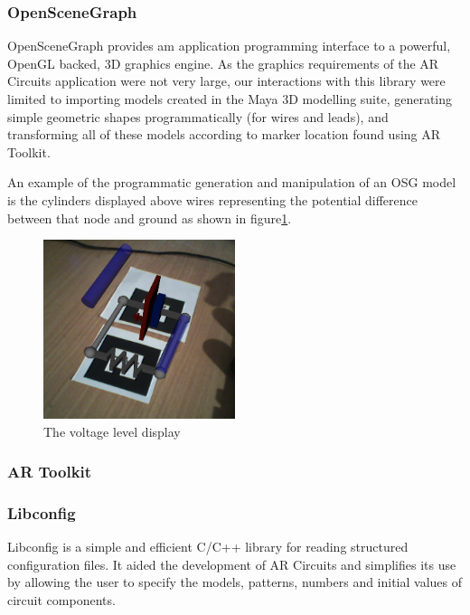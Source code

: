 \subsubsection{OpenSceneGraph}
OpenSceneGraph provides am application programming interface to a powerful,
OpenGL backed, 3D graphics engine. As the graphics requirements of the AR
Circuits application were not very large, our interactions with this
library were limited to importing models created in the Maya 3D modelling suite,
generating simple geometric shapes programmatically (for wires and leads), and
transforming all of these models according to marker location found using AR
Toolkit.

An example of the programmatic generation and manipulation of an OSG model is
the cylinders displayed above wires representing the potential difference
between that node and ground as shown in figure\ref{voltage}.
\begin{figure}
\begin{center}
\includegraphics[width=0.50\textwidth]{voltages}
\end{center}
\caption{The voltage level display}
\label{voltage}
\end{figure}


\subsubsection{AR Toolkit}


\subsubsection{Libconfig}
Libconfig is a simple and efficient C/C++ library for reading structured
configuration files. It aided the development of AR Circuits and simplifies its
use by allowing the user to specify the models, patterns, numbers and initial
values of circuit components.

